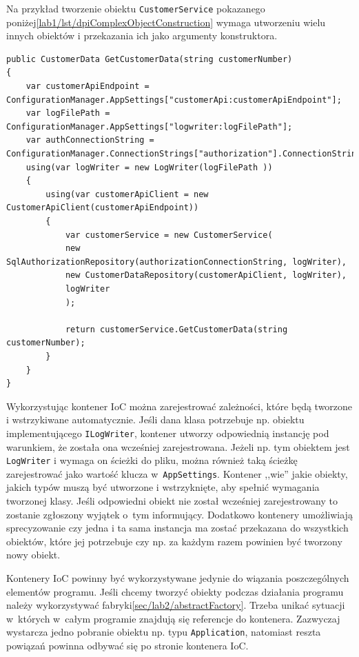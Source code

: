 Na przykład tworzenie obiektu \texttt{CustomerService} pokazanego poniżej\ref{lab1/lst/dpiComplexObjectConstruction} wymaga utworzeniu wielu innych obiektów i przekazania ich jako argumenty konstruktora.
\begin{lstlisting}[caption={Tworzenie obiektu posiadającego zależności wstrzykiwane przez konstruktor }, label={lab1/lst/dpiComplexObjectConstruction}]
public CustomerData GetCustomerData(string customerNumber)
{
	var customerApiEndpoint = ConfigurationManager.AppSettings["customerApi:customerApiEndpoint"];
	var logFilePath = ConfigurationManager.AppSettings["logwriter:logFilePath"];
	var authConnectionString = ConfigurationManager.ConnectionStrings["authorization"].ConnectionString;
	using(var logWriter = new LogWriter(logFilePath ))
	{
		using(var customerApiClient = new CustomerApiClient(customerApiEndpoint))
		{
			var customerService = new CustomerService(
			new SqlAuthorizationRepository(authorizationConnectionString, logWriter),
			new CustomerDataRepository(customerApiClient, logWriter),
			logWriter
			);   
			
			return customerService.GetCustomerData(string customerNumber);
		}
	}
}
\end{lstlisting}
Wykorzystując kontener IoC można zarejestrować zależności, które będą tworzone i wstrzykiwane automatycznie. Jeśli dana klasa potrzebuje np. obiektu implementującego \texttt{ILogWriter}, kontener utworzy odpowiednią instancję pod warunkiem, że została ona wcześniej zarejestrowana. Jeżeli np. tym obiektem jest \texttt{LogWriter} i wymaga on ścieżki do pliku, można również taką ścieżkę zarejestrować jako wartość klucza w~\texttt{AppSettings}. Kontener ,,wie'' jakie obiekty, jakich typów muszą być utworzone i wstrzyknięte, aby spełnić wymagania tworzonej klasy. Jeśli odpowiedni obiekt nie został wcześniej zarejestrowany to zostanie zgłoszony wyjątek o~tym informujący. Dodatkowo kontenery umożliwiają sprecyzowanie czy jedna i ta sama instancja ma zostać przekazana do wszystkich obiektów, które jej potrzebuje czy np. za każdym razem powinien być tworzony nowy obiekt.

Kontenery IoC powinny być wykorzystywane jedynie do wiązania poszczególnych elementów programu. Jeśli chcemy tworzyć obiekty podczas działania programu należy wykorzystywać fabryki\ref{sec/lab2/abstractFactory}. Trzeba unikać sytuacji w~których w~całym programie znajdują się referencje do kontenera. Zazwyczaj wystarcza jedno pobranie obiektu np. typu \texttt{Application}, natomiast reszta powiązań powinna odbywać się po stronie kontenera IoC.

